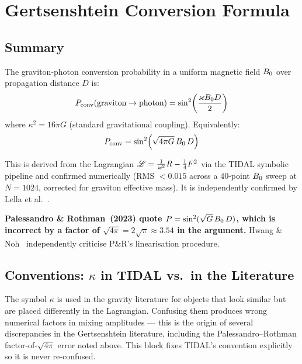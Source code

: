 
\section{Gertsenshtein Conversion Formula}
\label{sec:gertsenshtein-formula}

\subsection{Summary}

The graviton-photon conversion probability in a uniform magnetic field $B_0$ over propagation distance $D$ is:
\begin{equation}
  P_\mathrm{conv}(\text{graviton} \to \text{photon}) = \sin^2\!\left(\frac{\varkappa B_0 D}{2}\right)
  \label{eq:gertsenshtein-P}
\end{equation}
where $\kappa^2 = 16\pi G$ (standard gravitational coupling). Equivalently:
\begin{equation}
  P_\mathrm{conv} = \sin^2\!\left(\sqrt{4\pi G}\, B_0\, D\right)
  \label{eq:gertsenshtein-P-alt}
\end{equation}

This is derived from the Lagrangian $\mathscr{L} = \frac{1}{\varkappa^2}R - \frac{1}{4}F^2$ via the TIDAL symbolic pipeline and confirmed numerically (RMS $< 0.015$ across a 40-point $B_0$ sweep at $N=1024$, corrected for graviton effective mass). It is independently confirmed by Lella et al.~\cite{lella2024constraining}.

\textbf{Palessandro \& Rothman~(2023) quote $P = \sin^2(\sqrt{G}\,B_0\,D)$, which is incorrect by a factor of $\sqrt{4\pi} = 2\sqrt{\pi} \approx 3.54$ in the argument.} Hwang \& Noh~\cite{hwangnoh2023graviton} independently criticise P\&R's linearisation procedure.


\subsection{Conventions: $\kappa$ in TIDAL vs.\ in the Literature}
\label{sec:kappa-conventions}

The symbol $\kappa$ is used in the gravity literature for objects that look
similar but are placed differently in the Lagrangian. Confusing them produces
wrong numerical factors in mixing amplitudes — this is the origin of several
discrepancies in the Gertsenshtein literature, including the Palessandro--Rothman
factor-of-$\sqrt{4\pi}$ error noted above. This block fixes TIDAL's convention
explicitly so it is never re-confused.

